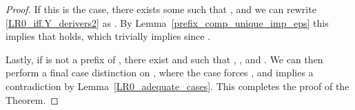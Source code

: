 \begin{isabellebody}
\begin{isamarkuptext}
\begin{theorem}
\begin{proof}
If this is the case, there exists some \isa{{\isasymzeta}} such that \isa{\isafree{{\isasymgamma}}\ {\isacharequal}{\kern0pt}\ \isafree{{\isasymalpha}}\ {\isacharat}{\kern0pt}\ \isafree{{\isasymbeta}}\ {\isacharat}{\kern0pt}\ \isafree{{\isasymzeta}}}, and we can rewrite 
\eqref{LR0_iff.Y_derivers2} as .
By Lemma~\ref{prefix_comp_unique_imp_eps} this implies that  holds,
which trivially implies \isa{{\isasymalpha}\ {\isacharequal}{\kern0pt}\ {\isasymgamma}} since \isa{{\isasymbeta}\ {\isacharequal}{\kern0pt}\ {\isacharbrackleft}{\kern0pt}{\isacharbrackright}{\kern0pt}}.

Lastly, if \isa{\isafree{{\isasymalpha}}\ {\isacharat}{\kern0pt}\ \isafree{{\isasymbeta}}} is not a prefix of \isa{{\isasymgamma}}, there exist  and  such 
that \isa{\isafree{{\isasymalpha}}\ {\isacharat}{\kern0pt}\ \isafree{{\isasymbeta}}\ {\isacharequal}{\kern0pt}\ \isafree{{\isasymgamma}}\ {\isacharat}{\kern0pt}\ \isafree{{\isasymzeta}}}, , and . We can then 
perform a final case distinction on , where the case  forces 
, and  implies a contradiction by 
Lemma~\ref{LR0_adequate_cases}. This completes the proof of the Theorem.
\end{proof}
\end{theorem}


\end{isamarkuptext}
\end{isabellebody}
